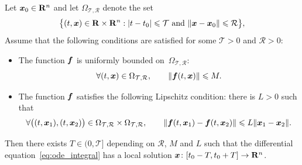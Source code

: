 \label{sec:existence}
\begin{theorem}
    \label{theorem:existence}
    Let $\mathbf{\boldsymbol{x}}_0 \in \mathbf R^n$ and let $\Omega_{\mathcal T, \mathcal R}$ denote the set
    \[
        \bigl\{(t, \mathbf{\boldsymbol{x}}) \in \mathbf R \times \mathbf R^n: \lvert t-t_0\rvert \leqslant \mathcal T \text{ and } \lVert\mathbf{\boldsymbol{x}} - \mathbf{\boldsymbol{x}}_0\rVert \leqslant \mathcal R \bigr\},
    \]
    Assume that the following conditions are satisfied for some $\mathcal T > 0$ and $\mathcal R > 0$:
    \begin{itemize}
        \item
            The function $\mathbf{\boldsymbol{f}}$ is uniformly bounded on~$\Omega_{\mathcal T, \mathcal R}$:
            \begin{equation}
                \label{eq:boundedness_ode}
                \forall (t, \mathbf{\boldsymbol{x}}) \in \Omega_{\mathcal T, \mathcal R}, \qquad
                \lVert\mathbf{\boldsymbol{f}}(t, \mathbf{\boldsymbol{x}})\rVert \leqslant M.
            \end{equation}

        \item
            The function $\mathbf{\boldsymbol{f}}$ satisfies the following Lipschitz condition:
            there is $L > 0$ such that
            \begin{equation}
                \label{eq:local_lipschitz_ode}
                \forall \bigl((t, \mathbf{\boldsymbol{x}}_1), (t, \mathbf{\boldsymbol{x}}_2)\bigr) \in \Omega_{\mathcal T, \mathcal R} \times \Omega_{\mathcal T, \mathcal R}, \qquad
                \lVert \mathbf{\boldsymbol{f}}(t, \mathbf{\boldsymbol{x}}_1) - \mathbf{\boldsymbol{f}}(t, \mathbf{\boldsymbol{x}}_2) \rVert \leqslant L \lVert\mathbf{\boldsymbol{x}}_1 - \mathbf{\boldsymbol{x}}_2\rVert.
            \end{equation}
    \end{itemize}
    Then there exists $T \in (0, \mathcal T]$ depending on $\mathcal R$, $M$ and $L$ such that
    the differential equation~\eqref{eq:ode_integral} has a local solution $\mathbf{\boldsymbol{x}}\colon [t_0 - T, t_0 + T] \to \mathbf R^n$.
\end{theorem}
